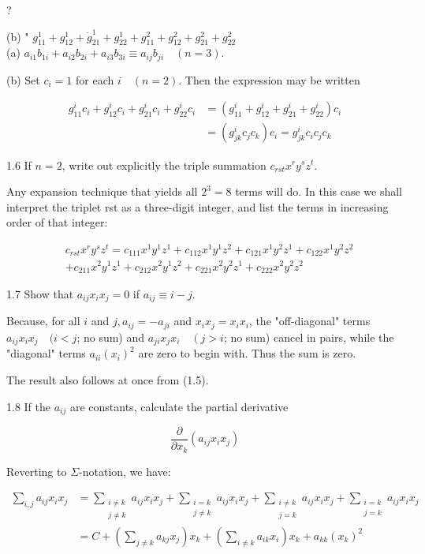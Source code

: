 \documentclass[10pt]{article}
\begin{document}
?

(b) " $g_{11}^{1}+g_{12}^{1}+\dot{g}_{21}^{1}+g_{22}^{1}+g_{11}^{2}+g_{12}^{2}+g_{21}^{2}+g_{22}^{2}$\\
(a) $a_{i 1} b_{1 i}+a_{i 2} b_{2 i}+a_{i 3} b_{3 i} \equiv a_{i j} b_{j i} \quad(n=3)$.

(b) Set $c_{i}=1$ for each $i \quad(n=2)$. Then the expression may be written

$$
\begin{aligned}
g_{11}^{i} c_{i}+g_{12}^{i} c_{i}+g_{21}^{i} c_{i}+g_{22}^{i} c_{i} & =\left(g_{11}^{i}+g_{12}^{i}+g_{21}^{i}+g_{22}^{i}\right) c_{i} \\
& =\left(g_{j k}^{i} c_{j} c_{k}\right) c_{i}=g_{j k}^{i} c_{i} c_{j} c_{k}
\end{aligned}
$$

1.6 If $n=2$, write out explicitly the triple summation $c_{r s t} x^{r} y^{s} z^{t}$.

Any expansion technique that yields all $2^{3}=8$ terms will do. In this case we shall interpret the triplet rst as a three-digit integer, and list the terms in increasing order of that integer:

$$
\begin{aligned}
& c_{r s t} x^{r} y^{s} z^{t}=c_{111} x^{1} y^{1} z^{1}+c_{112} x^{1} y^{1} z^{2}+c_{121} x^{1} y^{2} z^{1}+c_{122} x^{1} y^{2} z^{2} \\
& +c_{211} x^{2} y^{1} z^{1}+c_{212} x^{2} y^{1} z^{2}+c_{221} x^{2} y^{2} z^{1}+c_{222} x^{2} y^{2} z^{2}
\end{aligned}
$$

1.7 Show that $a_{i j} x_{i} x_{j}=0$ if $a_{i j} \equiv i-j$.

Because, for all $i$ and $j, a_{i j}=-a_{j i}$ and $x_{i} x_{j}=x_{i} x_{i}$, the "off-diagonal" terms $a_{i j} x_{i} x_{j} \quad(i<j$; no sum) and $a_{j i} x_{j} x_{i} \quad\left(j>i\right.$; no sum) cancel in pairs, while the "diagonal" terms $a_{i i}\left(x_{i}\right)^{2}$ are zero to begin with. Thus the sum is zero.

The result also follows at once from (1.5).

1.8 If the $a_{i j}$ are constants, calculate the partial derivative

$$
\frac{\partial}{\partial x_{k}}\left(a_{i j} x_{i} x_{j}\right)
$$

Reverting to $\Sigma$-notation, we have:

$$
\begin{aligned}
\sum_{i, j} a_{i j} x_{i} x_{j} & =\sum_{\substack{i \neq k \\
j \neq k}} a_{i j} x_{i} x_{j}+\sum_{\substack{i=k \\
j \neq k}} a_{i j} x_{i} x_{j}+\sum_{\substack{i \neq k \\
j=k}} a_{i j} x_{i} x_{j}+\sum_{\substack{i=k \\
j=k}} a_{i j} x_{i} x_{j} \\
& =C+\left(\sum_{j \neq k} a_{k j} x_{j}\right) x_{k}+\left(\sum_{i \neq k} a_{i k} x_{i}\right) x_{k}+a_{k k}\left(x_{k}\right)^{2}
\end{aligned}
$$
\end{document}
